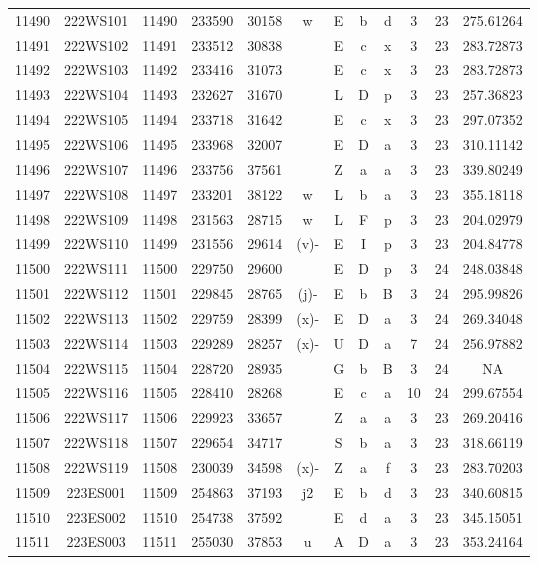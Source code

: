 \begin{tabular}{|*{12}{c|}}
11490 & 222WS101 & 11490 & 233590 & 30158 & w & E & b & d & 3 & 23 & 275.61264 \\ 
11491 & 222WS102 & 11491 & 233512 & 30838 &  & E & c & x & 3 & 23 & 283.72873 \\ 
11492 & 222WS103 & 11492 & 233416 & 31073 &  & E & c & x & 3 & 23 & 283.72873 \\ 
11493 & 222WS104 & 11493 & 232627 & 31670 &  & L & D & p & 3 & 23 & 257.36823 \\ 
11494 & 222WS105 & 11494 & 233718 & 31642 &  & E & c & x & 3 & 23 & 297.07352 \\ 
11495 & 222WS106 & 11495 & 233968 & 32007 &  & E & D & a & 3 & 23 & 310.11142 \\ 
11496 & 222WS107 & 11496 & 233756 & 37561 &  & Z & a & a & 3 & 23 & 339.80249 \\ 
11497 & 222WS108 & 11497 & 233201 & 38122 & w & L & b & a & 3 & 23 & 355.18118 \\ 
11498 & 222WS109 & 11498 & 231563 & 28715 & w & L & F & p & 3 & 23 & 204.02979 \\ 
11499 & 222WS110 & 11499 & 231556 & 29614 & (v)- & E & I & p & 3 & 23 & 204.84778 \\ 
11500 & 222WS111 & 11500 & 229750 & 29600 &  & E & D & p & 3 & 24 & 248.03848 \\ 
11501 & 222WS112 & 11501 & 229845 & 28765 & (j)- & E & b & B & 3 & 24 & 295.99826 \\ 
11502 & 222WS113 & 11502 & 229759 & 28399 & (x)- & E & D & a & 3 & 24 & 269.34048 \\ 
11503 & 222WS114 & 11503 & 229289 & 28257 & (x)- & U & D & a & 7 & 24 & 256.97882 \\ 
11504 & 222WS115 & 11504 & 228720 & 28935 &  & G & b & B & 3 & 24 & NA \\ 
11505 & 222WS116 & 11505 & 228410 & 28268 &  & E & c & a & 10 & 24 & 299.67554 \\ 
11506 & 222WS117 & 11506 & 229923 & 33657 &  & Z & a & a & 3 & 23 & 269.20416 \\ 
11507 & 222WS118 & 11507 & 229654 & 34717 &  & S & b & a & 3 & 23 & 318.66119 \\ 
11508 & 222WS119 & 11508 & 230039 & 34598 & (x)- & Z & a & f & 3 & 23 & 283.70203 \\ 
11509 & 223ES001 & 11509 & 254863 & 37193 & j2 & E & b & d & 3 & 23 & 340.60815 \\ 
11510 & 223ES002 & 11510 & 254738 & 37592 &  & E & d & a & 3 & 23 & 345.15051 \\ 
11511 & 223ES003 & 11511 & 255030 & 37853 & u & A & D & a & 3 & 23 & 353.24164 \\ 

\end{tabular}
